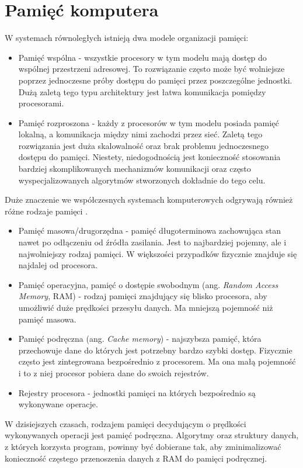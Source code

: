 \documentclass[a4paper,12pt]{book} %
\begin{document}
\section{Pamięć komputera}
W systemach równoległych istnieją dwa modele organizacji pamięci:
\begin{itemize}
	\item Pamięć wspólna - wszystkie procesory w tym modelu mają dostęp do wspólnej przestrzeni adresowej. To rozwiązanie często może być wolniejsze poprzez jednoczesne próby dostępu do pamięci przez poszczególne jednostki. Dużą zaletą tego typu architektury jest łatwa komunikacja pomiędzy procesorami.
	\item Pamięć rozproszona - każdy z procesorów w tym modelu posiada pamięć lokalną, a komunikacja między nimi zachodzi przez sieć. Zaletą tego rozwiązania jest duża skalowalność oraz brak problemu jednoczesnego dostępu do pamięci. Niestety, niedogodnością jest konieczność stosowania bardziej skomplikowanych mechanizmów komunikacji oraz często wyspecjalizowanych algorytmów stworzonych dokładnie do tego celu.
\end{itemize}
Duże znaczenie we współczesnych systemach komputerowych odgrywają również różne rodzaje pamięci \cite{hierarchia-pamieci}.
\begin{itemize}
	\item Pamięć masowa/drugorzędna - pamięć długoterminowa zachowująca stan nawet po odłączeniu od źródła zasilania. Jest to najbardziej pojemny, ale i najwolniejszy rodzaj pamięci. W większości przypadków fizycznie znajduje się najdalej od procesora.
	\item Pamięć operacyjna, pamięć o dostępie swobodnym (ang. \emph{Random Access Memory}, RAM) - rodzaj pamięci znajdujący się blisko procesora, aby umożliwić duże prędkości przesyłu danych. Ma mniejszą pojemność niż pamięć masowa.
	\item Pamięć podręczna (ang. \emph{Cache memory}) - najszybsza pamięć, która przechowuje dane do których jest potrzebny bardzo szybki dostęp. Fizycznie często jest zintegrowana bezpośrednio z procesorem. Ma ona małą pojemność i to z niej procesor pobiera dane do swoich rejestrów.
	\item Rejestry procesora - jednostki pamięci na których bezpośrednio są wykonywane operacje.
\end{itemize}
W dzisiejszych czasach, rodzajem pamięci decydującym o prędkości wykonywanych operacji jest pamięć podręczna. Algorytmy oraz struktury danych, z których korzysta program, powinny być dobierane tak, aby zminimalizować konieczność częstego przenoszenia danych z RAM do pamięci podręcznej.
\end{document}
